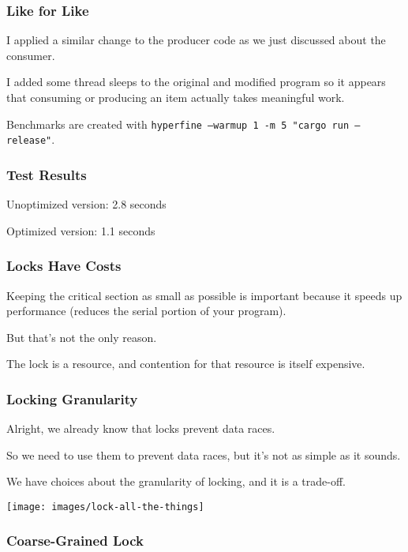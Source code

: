 \begin{frame}
\frametitle{Like for Like}
I applied a similar change to the producer code as we just discussed about the consumer. 
 
I added some thread sleeps to the original and modified program so it appears that consuming or producing an item actually takes meaningful work. 

Benchmarks are created with \texttt{hyperfine --warmup 1 -m 5 "cargo run --release"}.
 

\end{frame}


\begin{frame}
\frametitle{Test Results}

Unoptimized version: 2.8 seconds


Optimized version: 1.1 seconds


\end{frame}




\begin{frame}
\frametitle{Locks Have Costs}

Keeping the critical section as small as possible is important because it speeds up performance (reduces the serial portion of your program). 

But that's not the only reason. 

The lock is a resource, and contention for that resource is itself expensive.


\end{frame}


\begin{frame}
\frametitle{Locking Granularity}
Alright, we already know that locks prevent data races.

So we need to use them to prevent data races, but it's not as simple as it sounds. 

We have choices about the granularity of locking, and it is a trade-off.


  \begin{center}
    \texttt{[image: images/lock-all-the-things]}
  \end{center}
\end{frame}

\begin{frame}
\frametitle{Coarse-Grained Lock}

  \begin{center}
    
  \end{center}

\end{frame}

